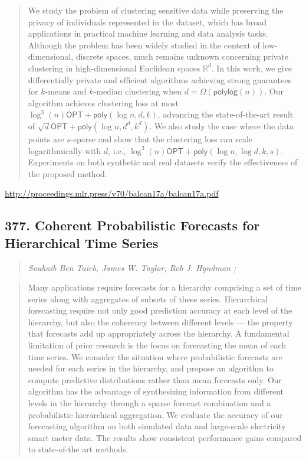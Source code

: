 \documentclass{article}
\begin{document}
\begin{quote}
    We study the problem of clustering sensitive data while preserving the privacy of individuals represented in the dataset, which has broad applications in practical machine learning and data analysis tasks. Although the problem has been widely studied in the context of low-dimensional, discrete spaces, much remains unknown concerning private clustering in high-dimensional Euclidean spaces $\mathbb{R}^d$. In this work, we give differentially private and efficient algorithms achieving strong guarantees for $k$-means and $k$-median clustering when $d=\Omega(\mathsf{polylog}(n))$. Our algorithm achieves clustering loss at most $\log^3(n)\mathsf{OPT}+\mathsf{poly}(\log n,d,k)$, advancing the state-of-the-art result of $\sqrt{d}\mathsf{OPT}+\mathsf{poly}(\log n,d^d,k^d)$. We also study the case where the data points are $s$-sparse and show that the clustering loss can scale logarithmically with $d$, i.e., $\log^3(n)\mathsf{OPT}+\mathsf{poly}(\log n,\log d,k,s)$. Experiments on both synthetic and real datasets verify the effectiveness of the proposed method.  \end{quote}

\href{http://proceedings.mlr.press/v70/balcan17a/balcan17a.pdf}{http://proceedings.mlr.press/v70/balcan17a/balcan17a.pdf}

\subsection{377. Coherent Probabilistic Forecasts for Hierarchical Time Series}

\begin{quote}
\footnotesize{\textit{Souhaib Ben Taieb, James W. Taylor, Rob J. Hyndman ;}}
\end{quote}

\begin{quote}
    Many applications require forecasts for a hierarchy comprising a set of time series along with aggregates of subsets of these series. Hierarchical forecasting require not only good prediction accuracy at each level of the hierarchy, but also the coherency between different levels — the property that forecasts add up appropriately across the hierarchy. A fundamental limitation of prior research is the focus on forecasting the mean of each time series. We consider the situation where probabilistic forecasts are needed for each series in the hierarchy, and propose an algorithm to compute predictive distributions rather than mean forecasts only. Our algorithm has the advantage of synthesizing information from different levels in the hierarchy through a sparse forecast combination and a probabilistic hierarchical aggregation. We evaluate the accuracy of our forecasting algorithm on both simulated data and large-scale electricity smart meter data. The results show consistent performance gains compared to state-of-the art methods.  \end{quote}
\end{document}

